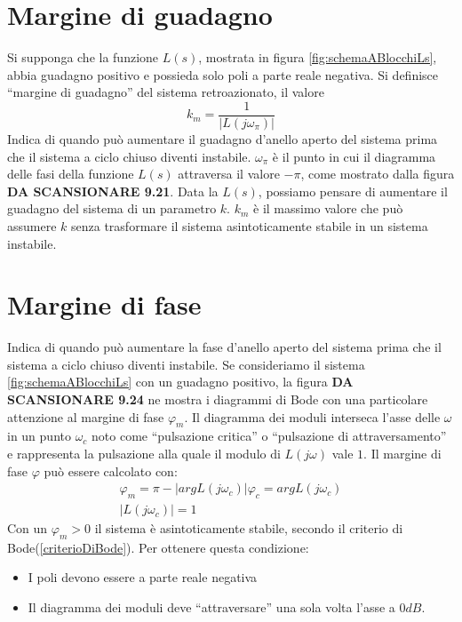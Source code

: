 \documentclass[a4paper]{report}
\newcommand{\bo}{\bfseries }
\begin{document}
\section{Margine di guadagno}

Si supponga che la funzione $L(s)$, mostrata in figura
\ref{fig:schemaABlocchiLs}, abbia guadagno positivo e possieda solo
poli a parte reale negativa. Si definisce ``margine di guadagno'' del
sistema retroazionato, il valore
\[
k_m = \dfrac{1}{|L(j \omega_\pi)|}
\]
Indica di quando pu\`o aumentare il guadagno d'anello aperto del sistema
prima che il sistema a ciclo chiuso diventi instabile.
$\omega_{\pi}$ \`e il punto in cui il diagramma delle fasi della funzione
$L(s)$ attraversa il valore $-\pi$, come mostrato dalla figura {\bo DA
  SCANSIONARE 9.21}. Data la $L(s)$, possiamo pensare di aumentare il
guadagno del sistema di un parametro $k$. $k_m$ \`e il massimo valore
che pu\`o assumere $k$ senza trasformare il sistema asintoticamente
stabile in un sistema instabile.
\section{Margine di fase}
Indica di quando pu\`o aumentare la fase d'anello aperto del sistema
prima che il sistema a ciclo chiuso diventi instabile.
Se consideriamo il sistema \ref{fig:schemaABlocchiLs} con un guadagno
positivo, la figura {\bo DA SCANSIONARE 9.24} ne mostra i diagrammi di
Bode con una particolare attenzione al margine di fase $\varphi_m$. Il
diagramma dei moduli interseca l'asse delle $\omega$ in un punto
$\omega_c$ noto come ``pulsazione critica'' o ``pulsazione di attraversamento'' e rappresenta la pulsazione alla quale il modulo di
$L(j \omega)$ vale $1$. Il margine di fase $\varphi$ pu\`o essere
calcolato con:
\[
\begin{array}{l}
  \varphi_m = \pi - |arg L(j \omega_c)|
  \varphi_c = arg L(j \omega_c)\\
  |L(j \omega_c)| = 1
\end{array}
\]
Con un $\varphi_m > 0$ il sistema \`e asintoticamente stabile, secondo
il criterio di Bode(\ref{criterioDiBode}). Per ottenere questa
condizione: 
\begin{itemize}
\item I poli devono essere a parte reale negativa
\item Il diagramma dei moduli deve ``attraversare'' una sola volta
  l'asse a $0 dB$.
\end{itemize}
\end{document}
